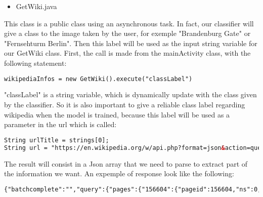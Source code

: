 \begin{itemize}
    \item{GetWiki.java}
\end{itemize}
This class is a public class using an asynchronous task. In fact, our classifier will give a class to the image taken by the user, for exemple "Brandenburg Gate" or "Fernsehturm Berlin". Then this label will be used as the input string variable for our GetWiki class. First, the call is made from the mainActivity class, with the following statement:
\begin{lstlisting}[language=XML, basicstyle=\scriptsize]
wikipediaInfos = new GetWiki().execute("classLabel")
\end{lstlisting}
"classLabel" is a string variable, which is dynamically update with the class given by the classifier. So it is also important to give a reliable class label regarding wikipedia when the model is trained, because this label will be used as a parameter in the url which is called:
\begin{lstlisting}[language=XML, basicstyle=\scriptsize]
String urlTitle = strings[0];
String url = "https://en.wikipedia.org/w/api.php?format=json&action=query&prop=extracts&exintro=&explaintext=&titles=" + urlTitle;
\end{lstlisting}
The result will consist in a Json array that we need to parse to extract part of the information we want. An expemple of response look like the following:
\begin{lstlisting}[language=XML, basicstyle=\scriptsize]
    {"batchcomplete":"","query":{"pages":{"156604":{"pageid":156604,"ns":0,"title":"Brandenburg Gate","extract":"The Brandenburg Gate (German: Brandenburger Tor) is an 18th-century neoclassical monument in Berlin, and one of the best-known landmarks of Germany. It is built on the site of a former city gate that marked the start of the road from Berlin to the town of Brandenburg an der Havel....\n"}}}}
\end{lstlisting}
